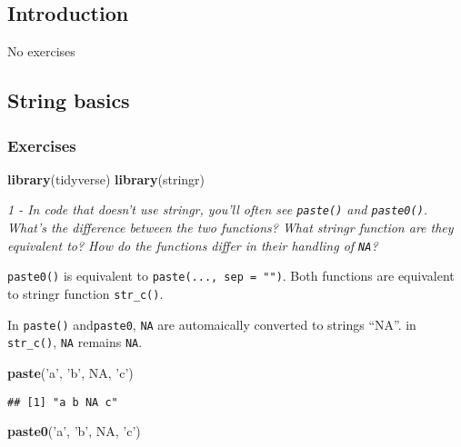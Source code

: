 \documentclass[]{article}
\newenvironment{Shaded}{\begin{snugshade}}{\end{snugshade}}
\newcommand{\KeywordTok}[1]{\textcolor[rgb]{0.13,0.29,0.53}{\textbf{#1}}}
\newcommand{\StringTok}[1]{\textcolor[rgb]{0.31,0.60,0.02}{#1}}
\newcommand{\OtherTok}[1]{\textcolor[rgb]{0.56,0.35,0.01}{#1}}
\newcommand{\NormalTok}[1]{#1}
\theoremstyle{definition}
\theoremstyle{definition}
\theoremstyle{definition}
\theoremstyle{remark}
\begin{document}
\subsection{Introduction}\label{introduction-10}

No exercises

\subsection{String basics}\label{string-basics}

\subsubsection{Exercises}\label{exercises-30}

\begin{Shaded}
\begin{Highlighting}[]
\KeywordTok{library}\NormalTok{(tidyverse)}
\KeywordTok{library}\NormalTok{(stringr)}
\end{Highlighting}
\end{Shaded}

\emph{1 - In code that doesn't use stringr, you'll often see
\texttt{paste()} and \texttt{paste0()}. What's the difference between
the two functions? What stringr function are they equivalent to? How do
the functions differ in their handling of \texttt{NA}?}

\texttt{paste0()} is equivalent to \texttt{paste(...,\ sep\ =\ "")}.
Both functions are equivalent to stringr function \texttt{str\_c()}.

In \texttt{paste()} and\texttt{paste0}, \texttt{NA} are automaically
converted to strings ``NA''. in \texttt{str\_c()}, \texttt{NA} remains
\texttt{NA}.

\begin{Shaded}
\begin{Highlighting}[]
\KeywordTok{paste}\NormalTok{(}\StringTok{'a'}\NormalTok{, }\StringTok{'b'}\NormalTok{, }\OtherTok{NA}\NormalTok{, }\StringTok{'c'}\NormalTok{)}
\end{Highlighting}
\end{Shaded}

\begin{verbatim}
## [1] "a b NA c"
\end{verbatim}

\begin{Shaded}
\begin{Highlighting}[]
\KeywordTok{paste0}\NormalTok{(}\StringTok{'a'}\NormalTok{, }\StringTok{'b'}\NormalTok{, }\OtherTok{NA}\NormalTok{, }\StringTok{'c'}\NormalTok{)}
\end{Highlighting}
\end{Shaded}
\end{document}
